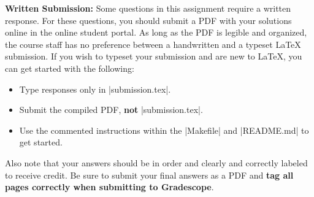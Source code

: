 {\bf Written Submission:}
Some questions in this assignment require a written response.  For these questions, you should submit a PDF
with your solutions online in the online student portal. As long as the PDF is legible and organized, the course
staff has no preference between a handwritten and a typeset \LaTeX{} submission.
If you wish to typeset your submission and are new to \LaTeX{}, you can get started with the following:\\

\begin{itemize}
  \item Type responses only in |submission.tex|.
  \item Submit the compiled PDF, {\bf not} |submission.tex|.
  \item Use the commented instructions within the |Makefile| and |README.md| to
  get started.
\end{itemize}
\bigskip
Also note that your answers should be in order and clearly and correctly labeled to receive credit. Be sure to submit your final answers as a PDF and \textbf{tag all pages correctly when submitting to Gradescope}.
\bigskip
